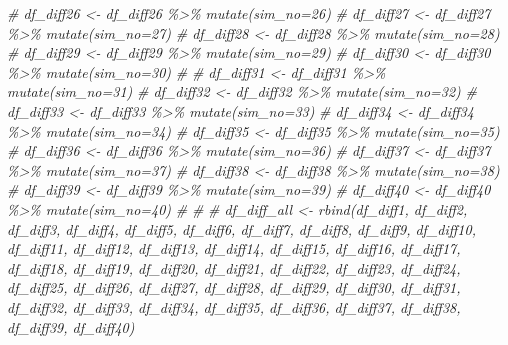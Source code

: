 \documentclass[
]{article}
\newenvironment{Shaded}{\begin{snugshade}}{\end{snugshade}}
\newcommand{\CommentTok}[1]{\textcolor[rgb]{0.56,0.35,0.01}{\textit{#1}}}
\begin{document}
\begin{Shaded}
\begin{Highlighting}[]
\CommentTok{\# df\_diff26 \textless{}{-} df\_diff26 \%\textgreater{}\% mutate(sim\_no=\textquotesingle{}26\textquotesingle{})}
\CommentTok{\# df\_diff27 \textless{}{-} df\_diff27 \%\textgreater{}\% mutate(sim\_no=\textquotesingle{}27\textquotesingle{})}
\CommentTok{\# df\_diff28 \textless{}{-} df\_diff28 \%\textgreater{}\% mutate(sim\_no=\textquotesingle{}28\textquotesingle{})}
\CommentTok{\# df\_diff29 \textless{}{-} df\_diff29 \%\textgreater{}\% mutate(sim\_no=\textquotesingle{}29\textquotesingle{})}
\CommentTok{\# df\_diff30 \textless{}{-} df\_diff30 \%\textgreater{}\% mutate(sim\_no=\textquotesingle{}30\textquotesingle{})}
\CommentTok{\# }
\CommentTok{\# df\_diff31 \textless{}{-} df\_diff31 \%\textgreater{}\% mutate(sim\_no=\textquotesingle{}31\textquotesingle{})}
\CommentTok{\# df\_diff32 \textless{}{-} df\_diff32 \%\textgreater{}\% mutate(sim\_no=\textquotesingle{}32\textquotesingle{})}
\CommentTok{\# df\_diff33 \textless{}{-} df\_diff33 \%\textgreater{}\% mutate(sim\_no=\textquotesingle{}33\textquotesingle{})}
\CommentTok{\# df\_diff34 \textless{}{-} df\_diff34 \%\textgreater{}\% mutate(sim\_no=\textquotesingle{}34\textquotesingle{})}
\CommentTok{\# df\_diff35 \textless{}{-} df\_diff35 \%\textgreater{}\% mutate(sim\_no=\textquotesingle{}35\textquotesingle{})}
\CommentTok{\# df\_diff36 \textless{}{-} df\_diff36 \%\textgreater{}\% mutate(sim\_no=\textquotesingle{}36\textquotesingle{})}
\CommentTok{\# df\_diff37 \textless{}{-} df\_diff37 \%\textgreater{}\% mutate(sim\_no=\textquotesingle{}37\textquotesingle{})}
\CommentTok{\# df\_diff38 \textless{}{-} df\_diff38 \%\textgreater{}\% mutate(sim\_no=\textquotesingle{}38\textquotesingle{})}
\CommentTok{\# df\_diff39 \textless{}{-} df\_diff39 \%\textgreater{}\% mutate(sim\_no=\textquotesingle{}39\textquotesingle{})}
\CommentTok{\# df\_diff40 \textless{}{-} df\_diff40 \%\textgreater{}\% mutate(sim\_no=\textquotesingle{}40\textquotesingle{})}
\CommentTok{\# }
\CommentTok{\# }
\CommentTok{\# df\_diff\_all \textless{}{-} rbind(df\_diff1, df\_diff2, df\_diff3, df\_diff4, df\_diff5, df\_diff6, df\_diff7, df\_diff8, df\_diff9, df\_diff10, df\_diff11, df\_diff12, df\_diff13, df\_diff14, df\_diff15, df\_diff16, df\_diff17, df\_diff18, df\_diff19, df\_diff20, df\_diff21, df\_diff22, df\_diff23, df\_diff24, df\_diff25, df\_diff26, df\_diff27, df\_diff28, df\_diff29, df\_diff30, df\_diff31, df\_diff32, df\_diff33, df\_diff34, df\_diff35, df\_diff36, df\_diff37, df\_diff38, df\_diff39, df\_diff40)}
\end{Highlighting}
\end{Shaded}
\end{document}

